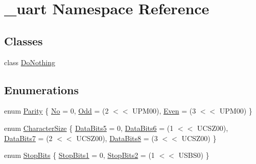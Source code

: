 \hypertarget{namespace__uart}{}\section{\+\_\+uart Namespace Reference}
\label{namespace__uart}
\subsection*{Classes}
\begin{DoxyCompactItemize}
\item 
class \hyperlink{class__uart_1_1DoNothing}{Do\+Nothing}
\end{DoxyCompactItemize}
\subsection*{Enumerations}
\begin{DoxyCompactItemize}
\item 
enum \hyperlink{namespace__uart_a16fe308815ad69599c2bd38839d2a15b}{Parity} \{ \newline
\hyperlink{namespace__uart_a16fe308815ad69599c2bd38839d2a15badb87fa1750d9fa6ef5cbf65c458e2fcc}{No} = 0, 
\newline
\hyperlink{namespace__uart_a16fe308815ad69599c2bd38839d2a15ba5ac120a618926612c85f8cc536c4bade}{Odd} = (2 $<$$<$ U\+P\+M00), 
\newline
\hyperlink{namespace__uart_a16fe308815ad69599c2bd38839d2a15ba7af2d85ba5627507566d6bf052cc23f8}{Even} = (3 $<$$<$ U\+P\+M00)
 \}
\item 
enum \hyperlink{namespace__uart_a6bcb12dc8982ef9737777dbfdbcce1e4}{Character\+Size} \{ \newline
\hyperlink{namespace__uart_a6bcb12dc8982ef9737777dbfdbcce1e4ad0e5fdc14db088f34ae0511f3c24511f}{Data\+Bits5} = 0, 
\newline
\hyperlink{namespace__uart_a6bcb12dc8982ef9737777dbfdbcce1e4ab02d0c0307f5776a637e683612ed0951}{Data\+Bits6} = (1 $<$$<$ U\+C\+S\+Z00), 
\newline
\hyperlink{namespace__uart_a6bcb12dc8982ef9737777dbfdbcce1e4a3a8859990166e4b9ebd957596184af96}{Data\+Bits7} = (2 $<$$<$ U\+C\+S\+Z00), 
\newline
\hyperlink{namespace__uart_a6bcb12dc8982ef9737777dbfdbcce1e4a25c3003045d5ccd2888e70a0d86966aa}{Data\+Bits8} = (3 $<$$<$ U\+C\+S\+Z00)
 \}
\item 
enum \hyperlink{namespace__uart_a72885456b9704c3d7d1656d112a4077f}{Stop\+Bits} \{ \newline
\hyperlink{namespace__uart_a72885456b9704c3d7d1656d112a4077fa5dff65c0d465d5ca6ce8625cdf1a2bed}{Stop\+Bits1} = 0, 
\newline
\hyperlink{namespace__uart_a72885456b9704c3d7d1656d112a4077fa7b11b05c6f148f5f42c6caf9049ecb2c}{Stop\+Bits2} = (1 $<$$<$ U\+S\+B\+S0)
 \}
\end{DoxyCompactItemize}
